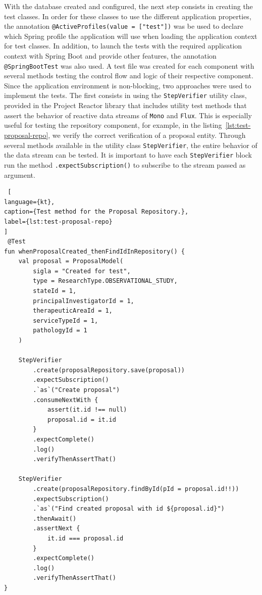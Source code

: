 With the database created and configured, the next step consists in creating the test classes. In order for these classes to use the different application properties, the annotation \lstinline[keywordstyle=\color{black}]{@ActiveProfiles(value = ["test"])} was be used to declare which Spring profile the application will use when loading the application context for test classes. In addition, to launch the tests with the required application context with Spring Boot and provide other features, the annotation \lstinline{@SpringBootTest} was also used. A test file was created for each component with several methods testing the control flow and logic of their respective component. Since the application environment is non-blocking, two approaches were used to implement the tests. The first consists in using the \lstinline{StepVerifier} utility class, provided in the Project Reactor library that includes utility test methods that assert the behavior of reactive data streams of \lstinline{Mono} and \lstinline{Flux}. This is especially useful for testing the repository component, for example, in the listing~\ref{lst:test-proposal-repo}, we verify the correct verification of a proposal entity. Through several methods available in the utility class \lstinline{StepVerifier}, the entire behavior of the data stream can be tested. It is important to have each \lstinline{StepVerifier} block run the method \lstinline{.expectSubscription()} to subscribe to the stream passed as argument.

\begin{lstlisting} [
language={kt},
caption={Test method for the Proposal Repository.},
label={lst:test-proposal-repo}
]
 @Test
fun whenProposalCreated_thenFindIdInRepository() {
    val proposal = ProposalModel(
        sigla = "Created for test",
        type = ResearchType.OBSERVATIONAL_STUDY,
        stateId = 1,
        principalInvestigatorId = 1,
        therapeuticAreaId = 1,
        serviceTypeId = 1,
        pathologyId = 1
    )

    StepVerifier
        .create(proposalRepository.save(proposal))
        .expectSubscription()
        .`as`("Create proposal")
        .consumeNextWith {
            assert(it.id !== null)
            proposal.id = it.id
        }
        .expectComplete()
        .log()
        .verifyThenAssertThat()

    StepVerifier
        .create(proposalRepository.findById(pId = proposal.id!!))
        .expectSubscription()
        .`as`("Find created proposal with id ${proposal.id}")
        .thenAwait()
        .assertNext {
            it.id === proposal.id
        }
        .expectComplete()
        .log()
        .verifyThenAssertThat()
}   
\end{lstlisting}


